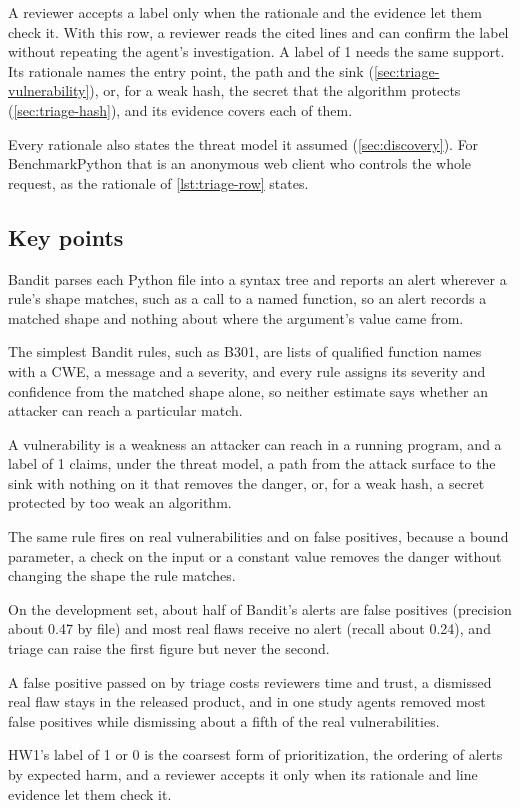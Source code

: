 A reviewer accepts a label only when the rationale and the evidence let them check it. With this
row, a reviewer reads the cited lines and can confirm the label without repeating the agent's
investigation. A label of 1 needs the same support. Its rationale names the entry point, the path and
the sink (\cref{sec:triage-vulnerability}), or, for a weak hash, the secret that the algorithm
protects (\cref{sec:triage-hash}), and its evidence covers each of them.

Every rationale also states the threat model it assumed (\cref{sec:discovery}). For BenchmarkPython
that is an anonymous web client who controls the whole request, as the rationale of
\cref{lst:triage-row} states.

\subsection*{Key points}
\bi
\item Bandit parses each Python file into a syntax tree and reports an alert wherever a rule's shape
matches, such as a call to a named function, so an alert records a matched shape and nothing about
where the argument's value came from.
\item The simplest Bandit rules, such as B301, are lists of qualified function names with a CWE, a
message and a severity, and every rule assigns its severity and confidence from the matched shape
alone, so neither estimate says whether an attacker can reach a particular match.
\item A vulnerability is a weakness an attacker can reach in a running program, and a label of 1
claims, under the threat model, a path from the attack surface to the sink with nothing on it that
removes the danger, or, for a weak hash, a secret protected by too weak an algorithm.
\item The same rule fires on real vulnerabilities and on false positives, because a bound parameter,
a check on the input or a constant value removes the danger without changing the shape the rule
matches.
\item On the development set, about half of Bandit's alerts are false positives (precision about
0.47 by file) and most real flaws receive no alert (recall about 0.24), and triage can raise the
first figure but never the second.
\item A false positive passed on by triage costs reviewers time and trust, a dismissed real flaw stays
in the released product, and in one study agents removed most false positives while dismissing about
a fifth of the real vulnerabilities.
\item HW1's label of 1 or 0 is the coarsest form of prioritization, the ordering of alerts by expected
harm, and a reviewer accepts it only when its rationale and line evidence let them check it.
\ei
